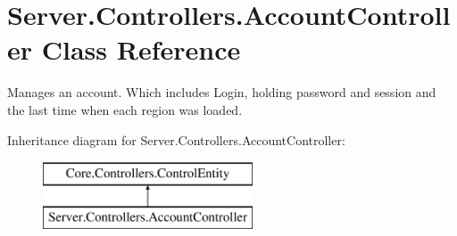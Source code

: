\hypertarget{classServer_1_1Controllers_1_1AccountController}{}\section{Server.\+Controllers.\+Account\+Controller Class Reference}
\label{classServer_1_1Controllers_1_1AccountController}


Manages an account. Which includes Login, holding password and session and the last time when each region was loaded.  


Inheritance diagram for Server.\+Controllers.\+Account\+Controller\+:\begin{figure}[H]
\begin{center}
\leavevmode
\includegraphics[height=2.000000cm]{classServer_1_1Controllers_1_1AccountController}
\end{center}
\end{figure}
